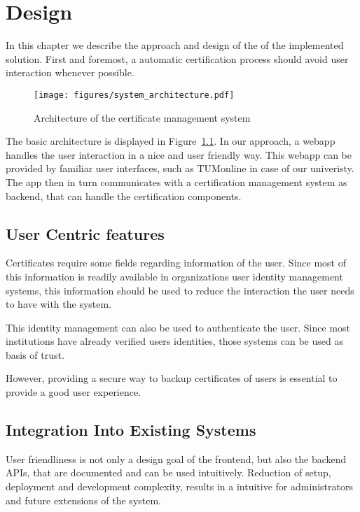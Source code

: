 \chapter{Design}\label{ch:design}

In this chapter we describe the approach and design of the of the implemented solution.
First and foremost, a automatic certification process should avoid user interaction whenever possible.

\begin{figure}
    \centering
    \texttt{[image: figures/system\_architecture.pdf]}
    \caption{Architecture of the certificate management system}
    \label{fig:systemArchitecture}
\end{figure}

The basic architecture is displayed in Figure~\ref{fig:systemArchitecture}.
In our approach, a webapp handles the user interaction in a nice and user friendly way.
This webapp can be provided by familiar user interfaces, such as TUMonline in case of our univeristy.
The app then in turn communicates with a certification management system as backend, that can handle the certification
components.

\section{User Centric features}\label{sec:userDetails}
Certificates require some fields regarding information of the user.
Since most of this information is readily available in organizations user identity management systems, this information
should be used to reduce the interaction the user needs to have with the system.

This identity management can also be used to authenticate the user.
Since most institutions have already verified users identities, those systems can be used as basis of trust.

However, providing a secure way to backup certificates of users is essential to provide a good user experience.

\section{Integration Into Existing Systems}\label{sec:integrationIntoExistingSystems}
User friendliness is not only a design goal of the frontend, but also the backend APIs, that are documented and can be
used intuitively.
Reduction of setup, deployment and development complexity, results in a intuitive for administrators and future
extensions of the system.

